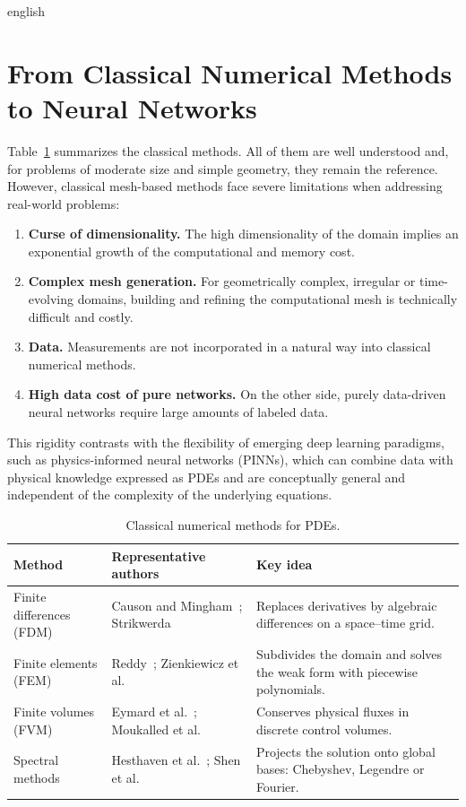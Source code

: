 \documentclass[11pt,letterpaper,twoside,openright]{book} %
\begin{document}
\begin{hyphenrules}{english}
\section{From Classical Numerical Methods to Neural Networks}\label{sec:pinn-background}

Table~\ref{tab:classical-methods} summarizes the classical methods. All of them are well understood and,
for problems of moderate size and simple geometry, they remain the reference. However, classical
mesh-based methods face severe limitations when addressing real-world problems:
\begin{enumerate}
  \item \textbf{Curse of dimensionality.} The high dimensionality of the domain implies an exponential
    growth of the computational and memory cost.
  \item \textbf{Complex mesh generation.} For geometrically complex, irregular or time-evolving domains,
    building and refining the computational mesh is technically difficult and costly.
  \item \textbf{Data.} Measurements are not incorporated in a natural way into classical numerical
    methods.
  \item \textbf{High data cost of pure networks.} On the other side, purely data-driven neural
    networks require large amounts of labeled data.
\end{enumerate}
This rigidity contrasts with the flexibility of emerging deep learning paradigms, such as
physics-informed neural networks (PINNs), which can combine data with physical knowledge expressed as
PDEs and are conceptually general and independent of the complexity of the underlying equations.

\begin{table}[htbp]
  \centering
  \caption{Classical numerical methods for PDEs.}
  \label{tab:classical-methods}
  \small
  \begin{tabularx}{\linewidth}{@{}lXX@{}}
    \toprule
    Method & Representative authors & Key idea \\
    \midrule
    Finite differences (FDM) & Causon and Mingham~\cite{causon2010}; Strikwerda~\cite{strikwerda2004} &
      Replaces derivatives by algebraic differences on a space--time grid. \\
    Finite elements (FEM) & Reddy~\cite{reddy2019}; Zienkiewicz et al.~\cite{zienkiewicz2013} &
      Subdivides the domain and solves the weak form with piecewise polynomials. \\
    Finite volumes (FVM) & Eymard et al.~\cite{eymard2000}; Moukalled et al.~\cite{moukalled2016} &
      Conserves physical fluxes in discrete control volumes. \\
    Spectral methods & Hesthaven et al.~\cite{hesthaven2007}; Shen et al.~\cite{shen2011} &
      Projects the solution onto global bases: Chebyshev, Legendre or Fourier. \\
    \bottomrule
  \end{tabularx}
\end{table}


\end{hyphenrules}
\end{document}
